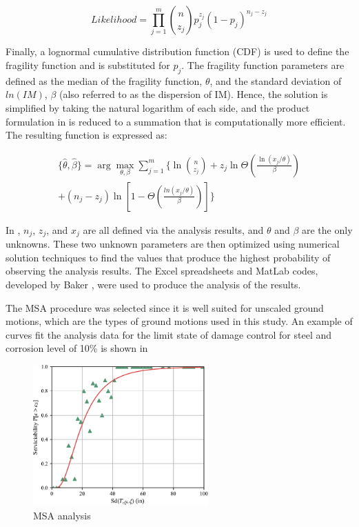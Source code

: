 \begin{equation}
   Likelihood=\prod_{j=1}^{m} \binom{n}{z_{j}}p_{j}^{z_{j}}(1-p_{j})^{n_{j}-z_{j}} 
   \label{eq:likelihood_MSA}
\end{equation}

Finally, a lognormal cumulative distribution function (CDF) is used to define the fragility function and is substituted for $p_j$. The fragility function parameters are defined as the median of the fragility function, $\theta$, and the standard deviation of $ln(IM)$, $\beta$ (also referred to as the dispersion of IM). Hence, the solution is simplified by taking the natural logarithm of each side, and the product formulation in is reduced to a summation that is computationally more efficient. The resulting function is expressed as:

\begin{equation}
\begin{aligned}
  \{\hat{\theta},\hat{\beta}\}=\arg \max_{\theta,\beta} \sum_{j=1}^{m} \bigg\{\ln\binom{n}{z_{j}} +z_{j}\ln\Theta\left(\frac{\ln(x_{j}/\theta)}{\beta}\right) \\
  + (n_{j}-z_{j})\ln\left[1-\Theta\left(\frac{ln(x_{j}/\theta)}{\beta}\right)\right]\bigg\} 
  \label{eq:hat_theta_beta_MSA}
\end{aligned}
\end{equation}

In , $n_j$, $z_j$, and $x_j$ are all defined via the analysis results, and $\theta$ and $\beta$ are the only unknowns. These two unknown parameters are then optimized using numerical solution techniques to find the values that produce the highest probability of observing the analysis results. The Excel spreadsheets and MatLab codes, developed by Baker \cite{Baker2015}, were used to produce the analysis of the results.

The MSA procedure was selected since it is well suited for unscaled ground motions, which are the types of ground motions used in this study. An example of curves fit the analysis data for the limit state of damage control for steel and corrosion level of 10\% is shown in 

\begin{figure}[htp]
	\centering
	\includegraphics[width=0.60\textwidth]{VAC Thesis 2.0/Chapter-5/figs/MSA_Calc.pdf}
	\caption{MSA analysis}
	\label{fig:msa_sample_01}
\end{figure}
